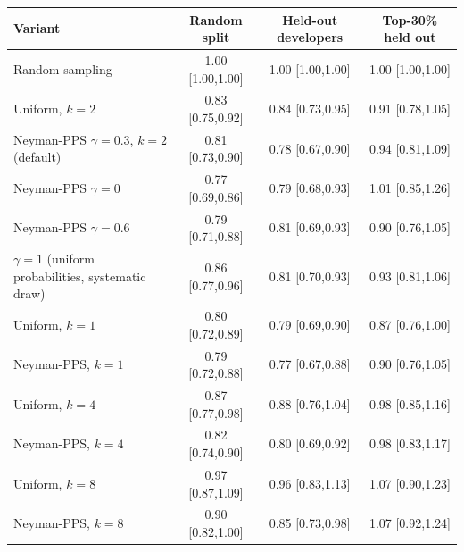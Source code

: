 \begin{tabular}{l ccc}
\toprule
Variant & Random split & Held-out developers & Top-30\% held out\\
\midrule
Random sampling & 1.00 {\scriptsize[1.00,1.00]} & 1.00 {\scriptsize[1.00,1.00]} & 1.00 {\scriptsize[1.00,1.00]} \\
Uniform, $k{=}2$ & 0.83 {\scriptsize[0.75,0.92]} & 0.84 {\scriptsize[0.73,0.95]} & 0.91 {\scriptsize[0.78,1.05]} \\
Neyman-PPS $\gamma{=}0.3$, $k{=}2$ (default) & 0.81 {\scriptsize[0.73,0.90]} & 0.78 {\scriptsize[0.67,0.90]} & 0.94 {\scriptsize[0.81,1.09]} \\
Neyman-PPS $\gamma{=}0$ & 0.77 {\scriptsize[0.69,0.86]} & 0.79 {\scriptsize[0.68,0.93]} & 1.01 {\scriptsize[0.85,1.26]} \\
Neyman-PPS $\gamma{=}0.6$ & 0.79 {\scriptsize[0.71,0.88]} & 0.81 {\scriptsize[0.69,0.93]} & 0.90 {\scriptsize[0.76,1.05]} \\
$\gamma{=}1$ (uniform probabilities, systematic draw) & 0.86 {\scriptsize[0.77,0.96]} & 0.81 {\scriptsize[0.70,0.93]} & 0.93 {\scriptsize[0.81,1.06]} \\
Uniform, $k{=}1$ & 0.80 {\scriptsize[0.72,0.89]} & 0.79 {\scriptsize[0.69,0.90]} & 0.87 {\scriptsize[0.76,1.00]} \\
Neyman-PPS, $k{=}1$ & 0.79 {\scriptsize[0.72,0.88]} & 0.77 {\scriptsize[0.67,0.88]} & 0.90 {\scriptsize[0.76,1.05]} \\
Uniform, $k{=}4$ & 0.87 {\scriptsize[0.77,0.98]} & 0.88 {\scriptsize[0.76,1.04]} & 0.98 {\scriptsize[0.85,1.16]} \\
Neyman-PPS, $k{=}4$ & 0.82 {\scriptsize[0.74,0.90]} & 0.80 {\scriptsize[0.69,0.92]} & 0.98 {\scriptsize[0.83,1.17]} \\
Uniform, $k{=}8$ & 0.97 {\scriptsize[0.87,1.09]} & 0.96 {\scriptsize[0.83,1.13]} & 1.07 {\scriptsize[0.90,1.23]} \\
Neyman-PPS, $k{=}8$ & 0.90 {\scriptsize[0.82,1.00]} & 0.85 {\scriptsize[0.73,0.98]} & 1.07 {\scriptsize[0.92,1.24]} \\
\bottomrule
\end{tabular}
